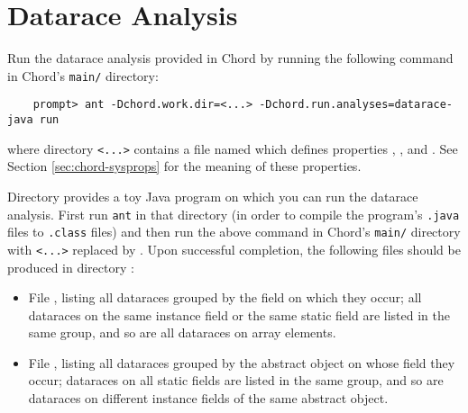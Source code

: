 \section{Datarace Analysis}
\label{sec:datarace}

Run the datarace analysis provided in Chord by running the following command in Chord's {\tt main/} directory:

\begin{verbatim}
    prompt> ant -Dchord.work.dir=<...> -Dchord.run.analyses=datarace-java run
\end{verbatim}

\noindent where directory {\tt <...>} contains a file named  which
defines properties , , and .
See Section \ref{sec:chord-sysprops} for the meaning of these properties.

Directory  provides a toy Java program on which you can run the datarace
analysis.
First run {\tt ant} in that directory (in order to compile the program's {\tt .java} files to
{\tt .class} files) and then run the above command in Chord's {\tt main/} directory
with {\tt <...>} replaced by .
Upon successful completion, the following files should be produced in directory
:

\begin{itemize}
\item
File , listing all dataraces grouped by the field on which they occur; all
dataraces on the same instance field or the same static field are listed in the same group, and so are
all dataraces on array elements.
\item
File , listing all dataraces grouped by the abstract object on whose field they occur;
dataraces on all static fields are listed in the same group, and so are dataraces on different
instance fields of the same abstract object.
\end{itemize}



